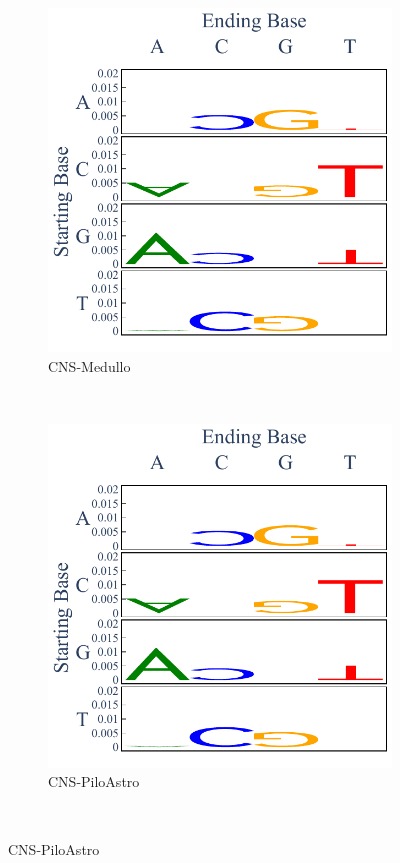 \begin{figure}[h!]
    \begin{subfigure}{.5\textwidth}
    \centering
    \includegraphics[scale=0.45]{graphics/spectra_CNS-Medullo.pdf}
    \caption{CNS-Medullo}
    \end{subfigure}
    ~
    \begin{subfigure}{.5\textwidth}
    \centering
    \includegraphics[scale=0.45]{graphics/spectra_CNS-PiloAstro.pdf}
    \caption{CNS-PiloAstro}
    \end{subfigure} \\
    

\end{figure}
